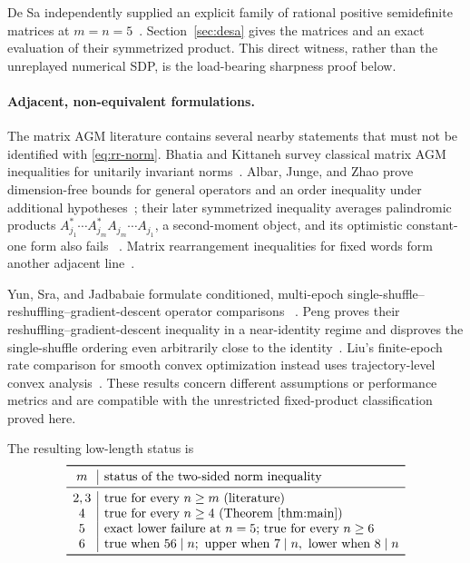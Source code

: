 \documentclass[11pt]{article}
\begin{document}
De Sa independently supplied an explicit family of rational positive semidefinite matrices at \(m=n=5\)~\cite{DeSa2020}.  Section~\ref{sec:desa} gives the matrices and an exact evaluation of their symmetrized product.  This direct witness, rather than the unreplayed numerical SDP, is the load-bearing sharpness proof below.

\paragraph{Adjacent, non-equivalent formulations.}
The matrix AGM literature contains several nearby statements that must not be
identified with \eqref{eq:rr-norm}.  Bhatia and Kittaneh survey classical
matrix AGM inequalities for unitarily invariant norms~\cite{BhatiaKittaneh2008}.
Albar, Junge, and Zhao prove dimension-free bounds for general operators and
an order inequality under additional hypotheses~\cite{AlbarJungeZhao2017};
their later symmetrized inequality averages palindromic products
\(A_{j_1}^{*}\cdots A_{j_m}^{*}A_{j_m}\cdots A_{j_1}\), a second-moment
object, and its optimistic constant-one form also fails
~\cite{AlbarJungeZhao2018}.  Matrix rearrangement inequalities for fixed words
form another adjacent line~\cite{AlaifariEtAl2020}.

Yun, Sra, and Jadbabaie formulate conditioned, multi-epoch
single-shuffle--reshuffling--gradient-descent operator comparisons
~\cite{YunSraJadbabaie2021}.  Peng proves their reshuffling--gradient-descent
inequality in a near-identity regime and disproves the single-shuffle ordering
even arbitrarily close to the identity~\cite{Peng2026}.  Liu's finite-epoch
rate comparison for smooth convex optimization instead uses trajectory-level
convex analysis~\cite{Liu2026}.  These results concern different assumptions
or performance metrics and are compatible with the unrestricted
fixed-product classification proved here.

The resulting low-length status is
\[
\begin{array}{c|l}
\toprule
m&\text{status of the two-sided norm inequality}\\
\midrule
2,3&\text{true for every }n\ge m\text{ (literature)}\\
4&\text{true for every }n\ge4\text{ (Theorem~\ref{thm:main})}\\
5&\text{exact lower failure at }n=5\text{; true for every }n\ge6\\
6&\text{true when }56\mid n;\ 
   \text{upper when }7\mid n,\ \text{lower when }8\mid n\\
\bottomrule
\end{array}
\]
\end{document}
